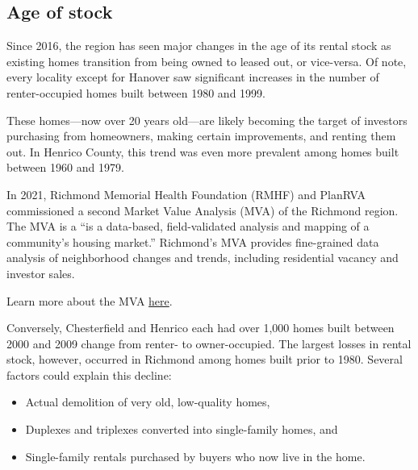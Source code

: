 \documentclass[
  letterpaper,
  DIV=11,
  numbers=noendperiod]{scrreprt}
\providecommand{\tightlist}{%
  \setlength{\itemsep}{0pt}\setlength{\parskip}{0pt}}\usepackage{longtable,booktabs,array}
\begin{document}
\hypertarget{age-of-stock-1}{%
\subsection{Age of stock}\label{age-of-stock-1}}

Since 2016, the region has seen major changes in the age of its rental
stock as existing homes transition from being owned to leased out, or
vice-versa. Of note, every locality except for Hanover saw significant
increases in the number of renter-occupied homes built between 1980 and
1999.

These homes---now over 20 years old---are likely becoming the target of
investors purchasing from homeowners, making certain improvements, and
renting them out. In Henrico County, this trend was even more prevalent
among homes built between 1960 and 1979.

\begin{tcolorbox}[enhanced jigsaw, colframe=quarto-callout-note-color-frame, arc=.35mm, bottomrule=.15mm, colbacktitle=quarto-callout-note-color!10!white, opacityback=0, left=2mm, rightrule=.15mm, title=\textcolor{quarto-callout-note-color}{\faInfo}\hspace{0.5em}{Market Value Analysis (MVA)}, colback=white, coltitle=black, toptitle=1mm, leftrule=.75mm, titlerule=0mm, breakable, opacitybacktitle=0.6, toprule=.15mm, bottomtitle=1mm]

In 2021, Richmond Memorial Health Foundation (RMHF) and PlanRVA
commissioned a second Market Value Analysis (MVA) of the Richmond
region. The MVA is a ``is a data-based, field-validated analysis and
mapping of a community's housing market.'' Richmond's MVA provides
fine-grained data analysis of neighborhood changes and trends, including
residential vacancy and investor sales.

Learn more about the MVA
\href{https://rmhfoundation.org/resource/richmond-memorial-health-foundation-co-sponsored-analysis-of-the-richmond-areas-housing-market-reveals-important-trends-for-residents-policymakers-and-investors/}{here}.

\end{tcolorbox}

Conversely, Chesterfield and Henrico each had over 1,000 homes built
between 2000 and 2009 change from renter- to owner-occupied. The largest
losses in rental stock, however, occurred in Richmond among homes built
prior to 1980. Several factors could explain this decline:

\begin{itemize}
\tightlist
\item
  Actual demolition of very old, low-quality homes,
\item
  Duplexes and triplexes converted into single-family homes, and
\item
  Single-family rentals purchased by buyers who now live in the home.
\end{itemize}
\end{document}

